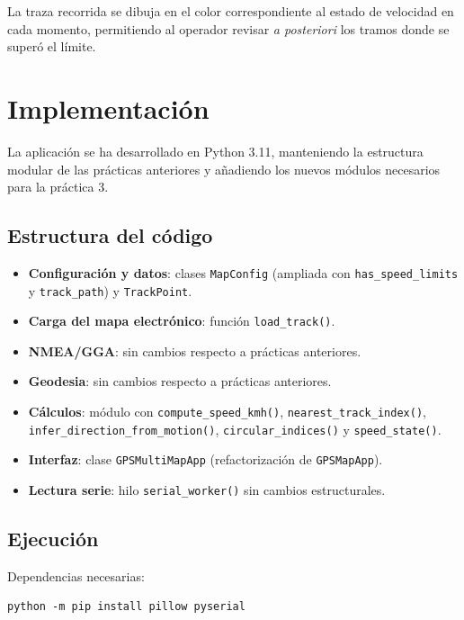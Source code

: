 \documentclass[10pt]{article}
\begin{document}
La traza recorrida se dibuja en el color correspondiente al estado de velocidad en cada momento, permitiendo al operador revisar \textit{a posteriori} los tramos donde se superó el límite.

\section{Implementación}

La aplicación se ha desarrollado en Python 3.11, manteniendo la estructura modular de las prácticas anteriores y añadiendo los nuevos módulos necesarios para la práctica 3.

\subsection{Estructura del código}

\begin{itemize}[leftmargin=1.2em]
    \item \textbf{Configuración y datos}: clases \texttt{MapConfig} (ampliada con \texttt{has\_speed\_limits} y \texttt{track\_path}) y \texttt{TrackPoint}.
    \item \textbf{Carga del mapa electrónico}: función \texttt{load\_track()}.
    \item \textbf{NMEA/GGA}: sin cambios respecto a prácticas anteriores.
    \item \textbf{Geodesia}: sin cambios respecto a prácticas anteriores.
    \item \textbf{Cálculos}: módulo con \texttt{compute\_speed\_kmh()}, \texttt{nearest\_track\_index()}, \texttt{infer\_direction\_from\_motion()}, \texttt{circular\_indices()} y \texttt{speed\_state()}.
    \item \textbf{Interfaz}: clase \texttt{GPSMultiMapApp} (refactorización de \texttt{GPSMapApp}).
    \item \textbf{Lectura serie}: hilo \texttt{serial\_worker()} sin cambios estructurales.
\end{itemize}

\subsection{Ejecución}

Dependencias necesarias:
\begin{lstlisting}[style=pythonEstilo]
python -m pip install pillow pyserial
\end{lstlisting}
\end{document}
